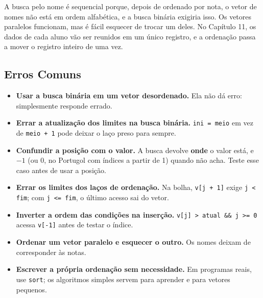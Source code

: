 A busca pelo nome é sequencial porque, depois de ordenado por nota, o vetor de nomes não está em ordem alfabética, e a busca binária exigiria isso. Os vetores paralelos funcionam, mas é fácil esquecer de trocar um deles. No Capítulo 11, os dados de cada aluno vão ser reunidos em um único registro, e a ordenação passa a mover o registro inteiro de uma vez.

\subsection{Erros Comuns}

\begin{itemize}
  \item \textbf{Usar a busca binária em um vetor desordenado.} Ela não dá erro: simplesmente responde errado.
  \item \textbf{Errar a atualização dos limites na busca binária.} \texttt{ini = meio} em vez de \texttt{meio + 1} pode deixar o laço preso para sempre.
  \item \textbf{Confundir a posição com o valor.} A busca devolve \textbf{onde} o valor está, e $-1$ (ou 0, no Portugol com índices a partir de 1) quando não acha. Teste esse caso antes de usar a posição.
  \item \textbf{Errar os limites dos laços de ordenação.} Na bolha, \texttt{v[j + 1]} exige \texttt{j < fim}; com \texttt{j <= fim}, o último acesso sai do vetor.
  \item \textbf{Inverter a ordem das condições na inserção.} \texttt{v[j] > atual \&\& j >= 0} acessa \texttt{v[-1]} antes de testar o índice.
  \item \textbf{Ordenar um vetor paralelo e esquecer o outro.} Os nomes deixam de corresponder às notas.
  \item \textbf{Escrever a própria ordenação sem necessidade.} Em programas reais, use \texttt{sort}; os algoritmos simples servem para aprender e para vetores pequenos.
\end{itemize}
